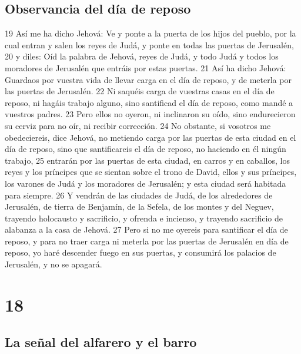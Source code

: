 \section*{Observancia del día de reposo}

19 Así me ha dicho Jehová: Ve y ponte a la puerta de los hijos del pueblo, por la cual entran y salen los reyes de Judá, y ponte en todas las puertas de Jerusalén,
20 y diles: Oíd la palabra de Jehová, reyes de Judá, y todo Judá y todos los moradores de Jerusalén que entráis por estas puertas.
21 Así ha dicho Jehová: Guardaos por vuestra vida de llevar carga en el día de reposo, y de meterla por las puertas de Jerusalén. 
22 Ni saquéis carga de vuestras casas en el día de reposo, ni hagáis trabajo alguno, sino santificad el día de reposo, como mandé a vuestros padres. 
23 Pero ellos no oyeron, ni inclinaron su oído, sino endurecieron su cerviz para no oír, ni recibir corrección.
24 No obstante, si vosotros me obedeciereis, dice Jehová, no metiendo carga por las puertas de esta ciudad en el día de reposo, sino que santificareis el día de reposo, no haciendo en él ningún trabajo,
25 entrarán por las puertas de esta ciudad, en carros y en caballos, los reyes y los príncipes que se sientan sobre el trono de David, ellos y sus príncipes, los varones de Judá y los moradores de Jerusalén; y esta ciudad será habitada para siempre.
26 Y vendrán de las ciudades de Judá, de los alrededores de Jerusalén, de tierra de Benjamín, de la Sefela, de los montes y del Neguev, trayendo holocausto y sacrificio, y ofrenda e incienso, y trayendo sacrificio de alabanza a la casa de Jehová.
27 Pero si no me oyereis para santificar el día de reposo, y para no traer carga ni meterla por las puertas de Jerusalén en día de reposo, yo haré descender fuego en sus puertas, y consumirá los palacios de Jerusalén, y no se apagará.


\chapter{18}

\section*{La señal del alfarero y el barro}

